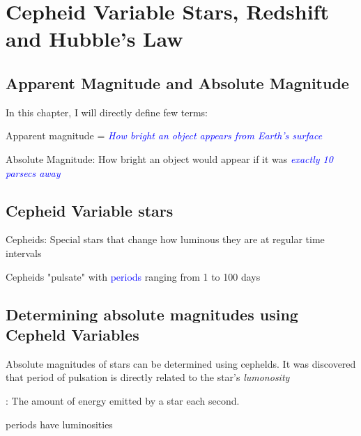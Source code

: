 \newpage
\section{Cepheid Variable Stars, Redshift and Hubble's Law}
\subsection{Apparent Magnitude and Absolute Magnitude}
In this chapter, I will directly define few terms:

\begin{definition}
   Apparent magnitude = \textit{\textcolor{blue}{How bright an object appears from Earth's surface}}
\end{definition}

\begin{definition}
    Absolute Magnitude: How bright an object would appear if it was \textit{\textcolor{blue}{exactly 10 parsecs away}}
\end{definition}

\subsection{Cepheid Variable stars}
\begin{definition}
    Cepheids: Special stars that change how luminous they are at regular time intervals
\end{definition}

Cepheids "pulsate" with \textcolor{blue}{periods} ranging from 1 to 100 days

\subsection{Determining absolute magnitudes using Cepheld Variables}
Absolute magnitudes of stars can be determined using cephelds. It was discovered that period of pulsation is directly related to the star's \textit{lumonosity}

\begin{beamerblock}
    \begin{definition}
         : The amount of energy emitted by a star each second.
    \end{definition}
\end{beamerblock}

\begin{center}
     periods have  luminosities
\end{center}

